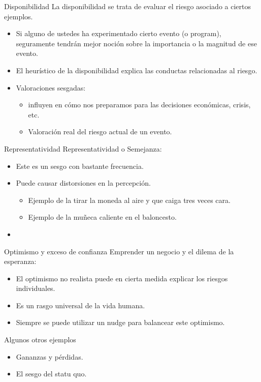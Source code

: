 \documentclass[11pt, aspectratio=169, compress]{beamer}
\begin{document}
\begin{frame}{Disponibilidad}
	La disponibilidad se trata de evaluar el riesgo asociado a ciertos ejemplos. 
	\begin{itemize}
		\item Si alguno de ustedes ha experimentado cierto evento (o program), seguramente tendrán mejor noción sobre la importancia o la magnitud de ese evento. 
		\item El heurístico de la disponibilidad explica las conductas relacionadas al riesgo. 
		\item Valoraciones sesgadas: 
		\begin{itemize}
			\item influyen en cómo nos preparamos para las decisiones económicas, crisis, etc. 
			\item Valoración real del riesgo actual de un evento. 
		\end{itemize}
	\end{itemize}
\end{frame}
\begin{frame}{Representatividad}
	Representatividad o Semejanza: 
	\begin{itemize}
		\item Este es un sesgo con bastante frecuencia. 
		\item Puede causar distorsiones en la percepción. 
		\begin{itemize}
			\item Ejemplo de la tirar la moneda al aire y que caiga tres veces cara.
			\item Ejemplo de la muñeca caliente en el baloncesto. 
		\end{itemize}
		\item 
	\end{itemize}
\end{frame}
\begin{frame}{Optimismo y exceso de confianza}
	Emprender un negocio y el dilema de la esperanza: 
	\begin{itemize}
		\item El optimismo no realista puede en cierta medida explicar los riesgos individuales. 
		\item Es un rasgo universal de la vida humana. 
		\item Siempre se puede utilizar un nudge para balancear este optimismo. 
	\end{itemize}
\end{frame}
\begin{frame}{Algunos otros ejemplos}
	\begin{itemize}
		\item Gananzas y pérdidas. 
		\item El sesgo del statu quo.		
	\end{itemize}
\end{frame}
\end{document}
